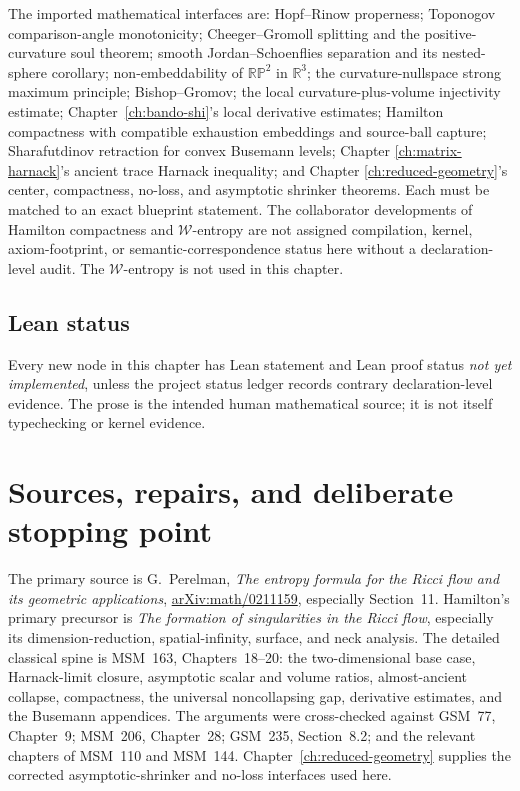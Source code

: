 \documentclass[10pt]{coll-l}
\newcommand{\R}{\mathbb{R}}
\theoremstyle{definition}
\theoremstyle{remark}
\numberwithin{section}{chapter}
\numberwithin{equation}{chapter}
\begin{document}
The imported mathematical interfaces are: Hopf--Rinow properness;
Toponogov comparison-angle monotonicity; Cheeger--Gromoll splitting and the
positive-curvature soul theorem; smooth Jordan--Schoenflies separation and
its nested-sphere corollary; non-embeddability of $\mathbb{RP}^2$ in
$\R^3$; the curvature-nullspace strong maximum principle; Bishop--Gromov;
the local curvature-plus-volume injectivity estimate;
Chapter~\ref{ch:bando-shi}'s local derivative estimates; Hamilton
compactness with compatible exhaustion embeddings and source-ball capture;
Sharafutdinov retraction for convex Busemann levels; Chapter
\ref{ch:matrix-harnack}'s ancient trace Harnack inequality; and Chapter
\ref{ch:reduced-geometry}'s center, compactness, no-loss, and asymptotic
shrinker theorems.  Each must be matched to an exact blueprint statement.
The collaborator developments of Hamilton compactness and
$\mathcal W$-entropy are not assigned compilation, kernel, axiom-footprint,
or semantic-correspondence status here without a declaration-level audit.
The $\mathcal W$-entropy is not used in this chapter.

\subsection*{Lean status}

Every new node in this chapter has Lean statement and Lean proof status
\emph{not yet implemented}, unless the project status ledger records
contrary declaration-level evidence.  The prose is the intended human
mathematical source; it is not itself typechecking or kernel evidence.

\section{Sources, repairs, and deliberate stopping point}
\label{sec:ksol-sources}

The primary source is G.~Perelman,
\emph{The entropy formula for the Ricci flow and its geometric
applications},
\href{https://arxiv.org/abs/math/0211159}{arXiv:math/0211159}, especially
Section~11.  Hamilton's primary precursor is
\emph{The formation of singularities in the Ricci flow}, especially its
dimension-reduction, spatial-infinity, surface, and neck analysis.  The
detailed classical spine is MSM~163, Chapters~18--20:
the two-dimensional base case, Harnack-limit closure, asymptotic scalar and
volume ratios, almost-ancient collapse, compactness, the universal
noncollapsing gap, derivative estimates, and the Busemann appendices.
The arguments were cross-checked against GSM~77, Chapter~9; MSM~206,
Chapter~28; GSM~235, Section~8.2; and the relevant chapters of MSM~110 and
MSM~144.  Chapter~\ref{ch:reduced-geometry} supplies the corrected
asymptotic-shrinker and no-loss interfaces used here.
\end{document}
